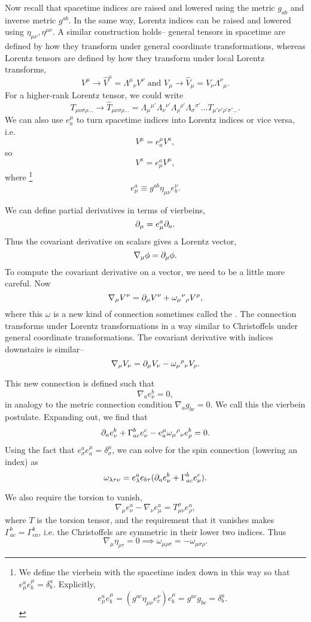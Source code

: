 Now recall that spacetime indices are raised and lowered using the metric $g_{ab}$ and inverse metric $g^{ab}$. In the same way, Lorentz indices can be raised and lowered using $\eta_{\mu\nu},\eta^{\mu\nu}$. A similar construction holds-- general tensors in spacetime are defined by how they transform under general coordinate transformations, whereas Lorentz tensors are defined by how they transform under local Lorentz transforms,
$$V^\mu \to \hat V^\mu=\Lambda^\mu{}_\nu V^\nu \text{ and }V_\mu \to \hat V_\mu = V_\nu \Lambda^\nu{}_\mu.$$
For a higher-rank Lorentz tensor, we could write
$$T_{\mu\nu\sigma\rho\ldots}\to \hat T_{\mu\nu\sigma\rho\ldots} = \Lambda_\mu{}^{\mu'}\Lambda_\nu{}^{\nu'}\Lambda_\rho{}^{\rho'}\Lambda_\sigma{}^{\sigma'}\ldots T_{\mu'\nu'\rho'\sigma'\ldots}.$$
We can also use $e^\mu_a$ to turn spacetime indices into Lorentz indices or vice versa, i.e.
$$V^\mu= e^\mu_a V^a,$$
so $$V^a = e^a_\mu V^\mu,$$ 
where
\footnote{We define the vierbein with the spacetime index down in this way so that $e^a_\mu e^\mu_b = \delta^a_b.$ Explicitly,
$$e^a_\mu e^\mu_b = (g^{ac}\eta_{\mu\nu} e^\nu_c) e^\mu_b= g^{ac} g_{bc}=\delta^a_b.$$}
$$e^a_\mu\equiv g^{ab} \eta_{\mu\nu} e^\nu_b.$$
 
We can define partial derivatives in terms of vierbeins,
$$\partial_\mu = e^a_\mu \partial_a.$$
Thus the covariant derivative on scalars gives a Lorentz vector,
$$\nabla_\mu \phi = \partial_\mu \phi.$$ To compute the covariant derivative on a vector, we need to be a little more careful. Now
$$\nabla_\mu V^\nu =\partial_\mu V^\nu + \omega_\mu{}^\nu{}_\rho V^\rho,$$
where this $\omega$ is a new kind of connection sometimes called the . The connection transforms under Lorentz transformations in a way similar to Christoffels under general coordinate transformations. The covariant derivative with indices downstairs is similar--
$$\nabla_\mu V_\nu = \partial_\mu V_\nu -\omega_\mu{}^\rho{}_\nu V_\rho.$$

This new connection is defined such that $$\nabla_a e^b_\nu =0,$$ in analogy to the metric connection condition $\nabla_a g_{bc}=0$. We call this the vierbein postulate. Expanding out, we find that
$$\partial_a e^b_\nu+\Gamma^b_{ac} e^c_\nu - e^\mu_a \omega_\mu{}^\rho{}_\nu e^b_\rho=0.$$
Using the fact that $e^a_\sigma e^\mu_a =\delta^\mu_\sigma$, we can solve for the spin connection (lowering an index) as
$$\omega_{\lambda \tau \nu}=e^a_\lambda e_{b\tau}(\partial_a e^b_\nu+\Gamma^b_{ac} e^c_\nu).$$

We also require the torsion to vanish,
$$\nabla_\mu e^a_\nu - \nabla_\nu e^a_\mu = T^\rho_{\mu\nu} e^a_\rho,$$
where $T$ is the torsion tensor, and the requirement that it vanishes makes $\Gamma^b_{ac}=\Gamma^b_{ca}$, i.e. the Christoffels are symmetric in their lower two indices. Thus
$$\nabla_\mu \eta_{\rho\tau}=0 \implies \omega_{\mu\rho\sigma}=-\omega_{\mu\sigma\rho}.$$

